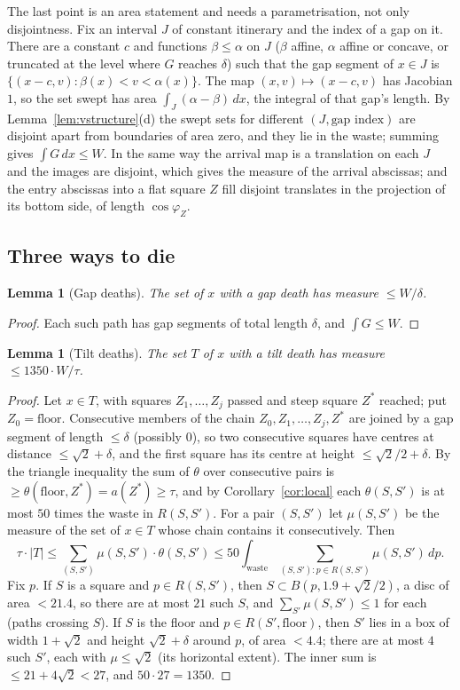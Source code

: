 \documentclass[11pt,letterpaper]{amsart}
\theoremstyle{plain}
\newtheorem{lemma}[theorem]{Lemma}
\theoremstyle{definition}
\theoremstyle{remark}
\begin{document}
The last point is an area statement and needs a parametrisation, not only disjointness. Fix an interval $J$ of constant itinerary and the index of a gap on it. There are a constant $c$ and functions $\beta\le\alpha$ on $J$ ($\beta$ affine, $\alpha$ affine or concave, or truncated at the level where $G$ reaches $\delta$) such that the gap segment of $x\in J$ is $\{(x-c,v):\beta(x)<v<\alpha(x)\}$. The map $(x,v)\mapsto(x-c,v)$ has Jacobian $1$, so the set swept has area $\int_J(\alpha-\beta)\,dx$, the integral of that gap's length. By Lemma~\ref{lem:vstructure}(d) the swept sets for different $(J,\text{gap index})$ are disjoint apart from boundaries of area zero, and they lie in the waste; summing gives $\int G\,dx\le W$. In the same way the arrival map is a translation on each $J$ and the images are disjoint, which gives the measure of the arrival abscissas; and the entry abscissas into a flat square $Z$ fill disjoint translates in the projection of its bottom side, of length $\cos\varphi_Z$.

\subsection{Three ways to die}
\begin{lemma}[Gap deaths]\label{lem:vgap}
The set of $x$ with a gap death has measure $\le W/\delta$.
\end{lemma}
\begin{proof}
Each such path has gap segments of total length $\delta$, and $\int G\le W$.
\end{proof}

\begin{lemma}[Tilt deaths]\label{lem:vtilt}
The set $T$ of $x$ with a tilt death has measure $\le1350\cdot W/\tau$.
\end{lemma}
\begin{proof}
Let $x\in T$, with squares $Z_1,\ldots,Z_j$ passed and steep square $Z^*$ reached; put $Z_0=\text{floor}$. Consecutive members of the chain $Z_0,Z_1,\ldots,Z_j,Z^*$ are joined by a gap segment of length $\le\delta$ (possibly $0$), so two consecutive squares have centres at distance $\le\sqrt2+\delta$, and the first square has its centre at height $\le\sqrt2/2+\delta$. By the triangle inequality the sum of $\theta$ over consecutive pairs is $\ge\theta(\text{floor},Z^*)=a(Z^*)\ge\tau$, and by Corollary~\ref{cor:local} each $\theta(S,S')$ is at most $50$ times the waste in $R(S,S')$. For a pair $(S,S')$ let $\mu(S,S')$ be the measure of the set of $x\in T$ whose chain contains it consecutively. Then
\[
\tau\cdot|T|\le\sum_{(S,S')}\mu(S,S')\cdot\theta(S,S')\le50\int_{\text{waste}}\sum_{(S,S'):p\in R(S,S')}\mu(S,S')\,dp.
\]
Fix $p$. If $S$ is a square and $p\in R(S,S')$, then $S\subset B(p,1.9+\sqrt2/2)$, a disc of area $<21.4$, so there are at most $21$ such $S$, and $\sum_{S'}\mu(S,S')\le1$ for each (paths crossing $S$). If $S$ is the floor and $p\in R(S',\text{floor})$, then $S'$ lies in a box of width $1+\sqrt2$ and height $\sqrt2+\delta$ around $p$, of area $<4.4$; there are at most $4$ such $S'$, each with $\mu\le\sqrt2$ (its horizontal extent). The inner sum is $\le21+4\sqrt2<27$, and $50\cdot27=1350$.
\end{proof}
\end{document}
